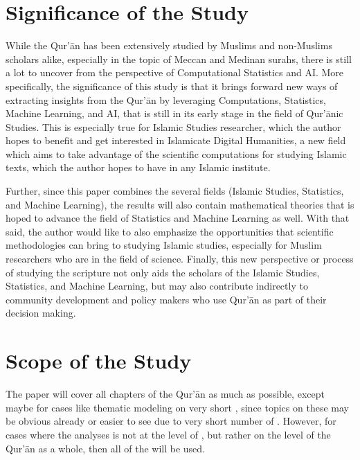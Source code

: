 \section{Significance of the Study}\label{sec:significance}
While the Qur'\=an has been extensively studied by Muslims and non-Muslims scholars alike, especially in the topic of Meccan and Medinan surahs, there is still a lot to uncover from the perspective of Computational Statistics and AI. More specifically, the significance of this study is that it brings forward new ways of extracting insights from the Qur'\=an by leveraging Computations, Statistics, Machine Learning, and AI, that is still in its early stage in the field of Qur'\=anic Studies. This is especially true for Islamic Studies researcher, which the author hopes to benefit and get interested in Islamicate Digital Humanities, a new field which aims to take advantage of the scientific computations for studying Islamic texts, which the author hopes to have in any Islamic institute. 

Further, since this paper combines the several fields (Islamic Studies, Statistics, and Machine Learning), the results will also contain mathematical theories that is hoped to advance the field of Statistics and Machine Learning as well. With that said, the author would like to also emphasize the opportunities that scientific methodologies can bring to studying Islamic studies, especially for Muslim researchers who are in the field of science. Finally, this new perspective or process of studying the scripture not only aids the scholars of the Islamic Studies, Statistics, and Machine Learning, but may also contribute indirectly to community development and policy makers who use Qur'\=an as part of their decision making.
\section{Scope of the Study}
The paper will cover all chapters of the Qur'\=an as much as possible, except maybe for cases like thematic modeling on very short  , since topics on these   may be obvious already or easier to see due to very short number of  . However, for cases where the analyses is not at the level of  , but rather on the level of the Qur'\=an as a whole, then all of the   will be used. 
